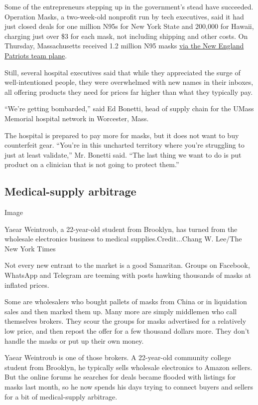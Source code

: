 Some of the entrepreneurs stepping up in the government's stead have
succeeded. Operation Masks, a two-week-old nonprofit run by tech
executives, said it had just closed deals for one million N95s for New
York State and 200,000 for Hawaii, charging just over \$3 for each mask,
not including shipping and other costs. On Thursday, Massachusetts
received 1.2 million N95 masks
\href{https://www.wsj.com/articles/a-million-n95-masks-are-coming-from-chinaon-board-the-new-england-patriots-plane-11585821600}{via
the New England Patriots team plane}.

Still, several hospital executives said that while they appreciated the
surge of well-intentioned people, they were overwhelmed with new names
in their inboxes, all offering products they need for prices far higher
than what they typically pay.

``We're getting bombarded,'' said Ed Bonetti, head of supply chain for
the UMass Memorial hospital network in Worcester, Mass.

The hospital is prepared to pay more for masks, but it does not want to
buy counterfeit gear. ``You're in this uncharted territory where you're
struggling to just at least validate,'' Mr. Bonetti said. ``The last
thing we want to do is put product on a clinician that is not going to
protect them.''

\hypertarget{medical-supply-arbitrage}{%
\subsection{Medical-supply arbitrage}\label{medical-supply-arbitrage}}

Image

Yaear Weintroub, a 22-year-old student from Brooklyn, has turned from
the wholesale electronics business to medical supplies.Credit...Chang W.
Lee/The New York Times

Not every new entrant to the market is a good Samaritan. Groups on
Facebook, WhatsApp and Telegram are teeming with posts hawking thousands
of masks at inflated prices.

Some are wholesalers who bought pallets of masks from China or in
liquidation sales and then marked them up. Many more are simply
middlemen who call themselves brokers. They scour the groups for masks
advertised for a relatively low price, and then repost the offer for a
few thousand dollars more. They don't handle the masks or put up their
own money.

Yaear Weintroub is one of those brokers. A 22-year-old community college
student from Brooklyn, he typically sells wholesale electronics to
Amazon sellers. But the online forums he searches for deals became
flooded with listings for masks last month, so he now spends his days
trying to connect buyers and sellers for a bit of medical-supply
arbitrage.

